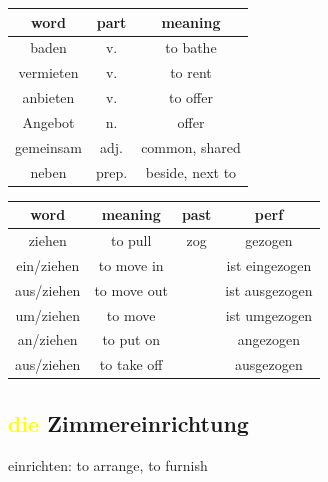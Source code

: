 \begin{center}
    \begin{tabular}{|c|c|c|}
        \hline
        \rowcolor{gray}
        word      & part  & meaning         \\
        \hline
        baden     & v.    & to bathe        \\
        vermieten & v.    & to rent         \\
        anbieten  & v.    & to offer        \\
        Angebot   & n.    & offer           \\
        \hline
        gemeinsam & adj.  & common, shared  \\
        \hline
        neben     & prep. & beside, next to \\
        \hline
    \end{tabular}
\end{center}

\begin{center}
    \begin{tabular}{|c|c|c|c|}
        \hline
        \rowcolor{gray}
        word       & meaning     & past & perf           \\
        \hline
        ziehen     & to pull     & zog  & gezogen        \\
        \hline
        ein/ziehen & to move in  &      & ist eingezogen \\
        aus/ziehen & to move out &      & ist ausgezogen \\
        um/ziehen  & to move     &      & ist umgezogen  \\
        \hline
        an/ziehen  & to put on   &      & angezogen      \\
        aus/ziehen & to take off &      & ausgezogen     \\
        \hline
    \end{tabular}
\end{center}

\subsection{\textcolor{yellow}{die} Zimmereinrichtung}

einrichten: to arrange, to furnish

